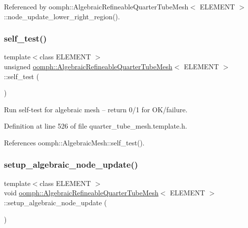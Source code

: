 Referenced by oomph\+::\+Algebraic\+Refineable\+Quarter\+Tube\+Mesh$<$ E\+L\+E\+M\+E\+N\+T $>$\+::node\+\_\+update\+\_\+lower\+\_\+right\+\_\+region().

\mbox{\label{classoomph_1_1AlgebraicRefineableQuarterTubeMesh_a1ad71be8274f4073b7e18cb53d574f10}} 
\subsubsection{\texorpdfstring{self\+\_\+test()}{self\_test()}}
{\footnotesize\ttfamily template$<$class E\+L\+E\+M\+E\+NT $>$ \\
unsigned \hyperlink{classoomph_1_1AlgebraicRefineableQuarterTubeMesh}{oomph\+::\+Algebraic\+Refineable\+Quarter\+Tube\+Mesh}$<$ E\+L\+E\+M\+E\+NT $>$\+::self\+\_\+test (\begin{DoxyParamCaption}{ }\end{DoxyParamCaption})\hspace{0.3cm}{\ttfamily [inline]}}



Run self-\/test for algebraic mesh -- return 0/1 for O\+K/failure. 



Definition at line 526 of file quarter\+\_\+tube\+\_\+mesh.\+template.\+h.



References oomph\+::\+Algebraic\+Mesh\+::self\+\_\+test().

\mbox{\label{classoomph_1_1AlgebraicRefineableQuarterTubeMesh_a2d0312615834a2aec8d0d6d4e2c846ef}} 
\subsubsection{\texorpdfstring{setup\+\_\+algebraic\+\_\+node\+\_\+update()}{setup\_algebraic\_node\_update()}}
{\footnotesize\ttfamily template$<$class E\+L\+E\+M\+E\+NT $>$ \\
void \hyperlink{classoomph_1_1AlgebraicRefineableQuarterTubeMesh}{oomph\+::\+Algebraic\+Refineable\+Quarter\+Tube\+Mesh}$<$ E\+L\+E\+M\+E\+NT $>$\+::setup\+\_\+algebraic\+\_\+node\+\_\+update (\begin{DoxyParamCaption}{ }\end{DoxyParamCaption})\hspace{0.3cm}{\ttfamily [private]}}



